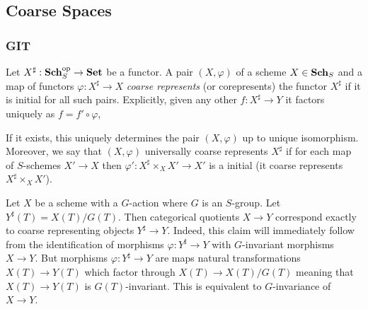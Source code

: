 \documentclass[12pt]{article}
\begin{document}
\begin{cor}

\end{cor}

\subsection{Coarse Spaces}

\subsubsection{GIT}

\newcommand{\Set}{\mathbf{Set}}

\begin{defn}
Let $X^{\sharp} : \Sch_S^\op \to \Set$ be a functor. A pair $(X, \varphi)$ of a scheme $X \in \mathbf{Sch}_S$ and a map of functors $\varphi : X^{\sharp} \to X$ \textit{coarse represents} (or corepresents) the functor $X^\sharp$ if it is initial for all such pairs. Explicitly, given any other $f : X^{\sharp} \to Y$ it factors uniquely as $f = f' \circ \varphi$,
\begin{center}
\end{center}
If it exists, this uniquely determines the pair $(X, \varphi)$ up to unique isomorphism.
\bigskip\\
Moreover, we say that $(X, \varphi)$ universally coarse represents $X^\sharp$ if for each map of $S$-schemes $X' \to X$ then $\varphi' : X^{\sharp} \times_X X' \to X'$ is a initial (it coarse represents $X^{\sharp} \times_X X'$).
\end{defn}


\begin{example}
Let $X$ be a scheme with a $G$-action where $G$ is an $S$-group. Let $Y^\sharp(T) = X(T)/G(T)$. Then categorical quotients $X \to Y$ correspond exactly to coarse representing objects $Y^{\sharp} \to Y$. Indeed, this claim will immediately follow from the identification of morphisms $\varphi : Y^\sharp \to Y$ with $G$-invariant morphisms $X \to Y$. But morphisms $\varphi : Y^\sharp \to Y$ are maps natural transformations $X(T) \to Y(T)$ which factor through $X(T) \to X(T)/G(T)$ meaning that $X(T) \to Y(T)$ is $G(T)$-invariant. This is equivalent to $G$-invariance of $X \to Y$.
\end{example}
\end{document}
